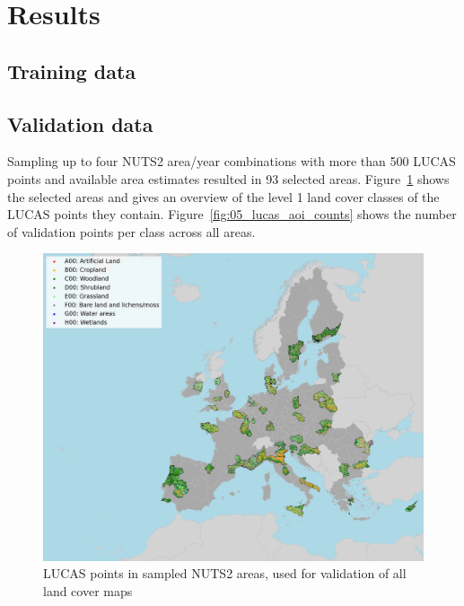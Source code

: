 \section{Results}
\subsection{Training data}
\subsection{Validation data}

Sampling up to four NUTS2 area/year combinations with more than 500 LUCAS points and available area estimates resulted in 93 selected areas. Figure~\ref{fig:05_lucas_aoi} shows the selected areas and gives an overview of the level 1 land cover classes of the LUCAS points they contain. Figure~\ref{fig:05_lucas_aoi_counts} shows the number of validation points per class across all areas.

\begin{figure}[h]
    \centering
    \includegraphics[width=\textwidth]{figs_05/fig_lucas_aoi.png}
    \caption{LUCAS points in sampled NUTS2 areas, used for validation of all land cover maps}
    \label{fig:05_lucas_aoi}
\end{figure}

